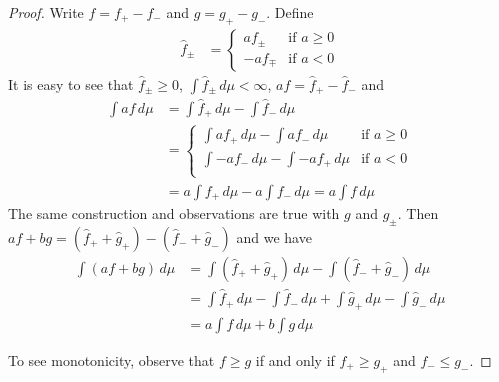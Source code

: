 \begin{proof}
Write $f = f_+ - f_-$ and $g = g_+ - g_-$.  Define 
\begin{align*}
\hat{f}_\pm &= \begin{cases}
a f_\pm & \text{if $a  \geq 0$} \\
-a f_\mp & \text{if $a < 0$}
\end{cases}
\end{align*} 
It is easy to see that $\hat{f}_\pm \geq 0$,
$\int \hat{f}_\pm \, d\mu < \infty$,  $a f = \hat{f}_+ - \hat{f}_-$
and
\begin{align*}
\int af \, d\mu &= \int \hat{f}_+ \, d\mu - \int \hat{f}_- \, d\mu\\
&= \begin{cases}
\int a f_+ \, d\mu - \int af_- \, d\mu & \text{if $a \geq 0$} \\
\int -a f_- \, d\mu - \int -af_+ \, d\mu & \text{if $a < 0$} \\
\end{cases}\\
&= a \int f_+ \, d\mu - a \int f_- \, d\mu = a \int f\, d\mu
\end{align*}  
The same construction and
observations are true with $g$ and $\hat{g}_\pm$.
Then $a f + b g = (\hat{f}_+ + \hat{g}_+) - (\hat{f}_- + \hat{g}_-)$
and we have
\begin{align*}
\int (a f + b g) \, d\mu &= \int (\hat{f}_+ + \hat{g}_+) \, d\mu -
\int (\hat{f}_- + \hat{g}_-) \, d\mu \\
&= \int \hat{f}_+ \, d\mu - \int \hat{f}_- \, d\mu + \int \hat{g}_+ \, d\mu -
\int \hat{g}_- \, d\mu \\
&= a \int f \, d\mu + b \int g \, d\mu
\end{align*}

To see monotonicity, observe that $f \geq g$ if and only if $f_+ \geq
g_+$ and $f_- \leq g_-$.
\end{proof}

